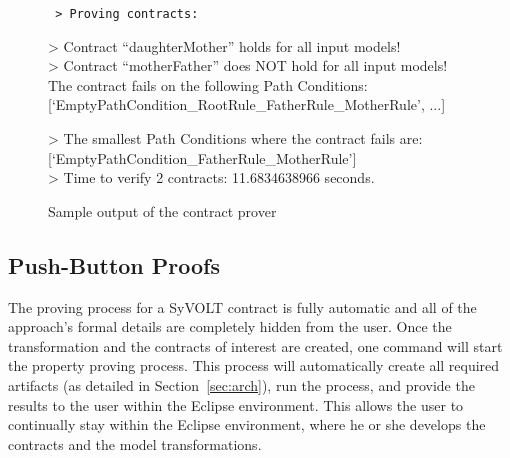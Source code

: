 

\begin{figure}

\scriptsize
\tt
> Proving contracts:

> Contract ``daughterMother'' holds for all input models!
\\
> Contract ``motherFather'' does NOT hold for all input models! The contract
fails on the following Path Conditions:
[`EmptyPathCondition\_RootRule\_FatherRule\_MotherRule', ...]

> The smallest Path Conditions where the contract fails are:
[`EmptyPathCondition\_FatherRule\_MotherRule']
\\
> Time to verify 2 contracts: 11.6834638966 seconds.
\caption{Sample output of the contract prover}
\label{fig:output}
\end{figure}

\subsection{Push-Button Proofs}
\label{sec:push_button_proofs}
The proving process for a SyVOLT contract is fully automatic and all of the
approach's formal details are completely hidden from the user. Once the
transformation and the contracts of interest are created, one command will start
the property proving process. This process will automatically create all
required artifacts (as detailed in Section~\ref{sec:arch}), run the process, and
provide the results to the user within the Eclipse environment. This allows the user to continually stay within the
Eclipse environment, where he or she develops the contracts and the
model transformations.



